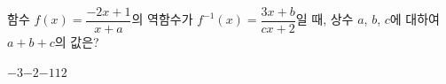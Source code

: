 \hspace*{2mm}\begin{minipage}[t]{\dimexpr\linewidth-2mm\relax}\vspace{0pt}
함수 $f(x)=\dfrac{-2x+1}{x+a}$의 역함수가 $f^{-1}(x)=\dfrac{3x+b}{cx+2}$일 때, 상수 $a$, $b$, $c$에 대하여 $a+b+c$의 값은?
\begin{choices32}{$-3$}{$-2$}{$-1$}{$1$}{$2$}\end{choices32}\end{minipage}

